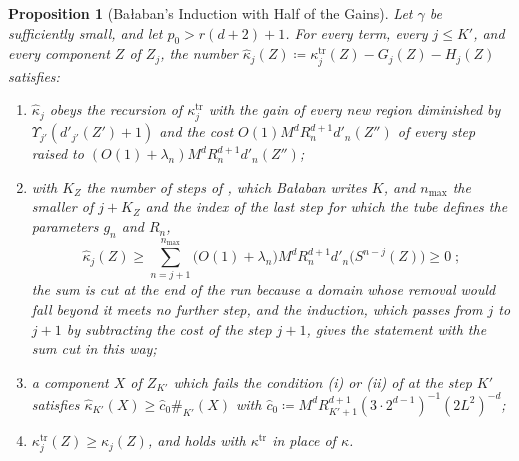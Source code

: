 \documentclass[11pt]{preprint}
\numberwithin{equation}{section}
\newtheorem{proposition}{Proposition}
\theoremstyle{definition}
\theoremstyle{remark}
\theoremstyle{plain}
\begin{document}
\begin{proposition}[Ba{\l}aban's Induction with Half of the Gains]\label{prop:half-gains}
Let $\gamma$ be sufficiently small, and let $p_0 > r(d + 2) + 1$. For every term, every $j \leq K'$, and every component $Z$ of $Z_j$, the number $\hat\kappa_j(Z) \coloneqq \kappa^{\mathrm{tr}}_j(Z) - G_j(Z) - H_j(Z)$ satisfies:
\begin{enumerate}[label=(\roman*)]
\item $\hat\kappa_j$ obeys the recursion of $\kappa^{\mathrm{tr}}_j$ with the gain of every new region diminished by $\Upsilon_{j'}(d'_{j'}(Z') + 1)$ and the cost $O(1)M^dR_n^{d+1}d'_n(Z'')$ of every step raised to $(O(1) + \lambda_n)M^dR_n^{d+1}d'_n(Z'')$;
\item with $K_Z$ the number of steps of \cite[(1.80)]{BalabanLFR2}, which Ba{\l}aban writes $K$, and $n_{\max}$ the smaller of $j + K_Z$ and the index of the last step for which the tube defines the parameters $g_n$ and $R_n$,
\begin{equation}\label{eq:half-gain-induction}
    \hat\kappa_j(Z) \geq \sum_{n=j+1}^{n_{\max}}\bigl(O(1) + \lambda_n\bigr)M^dR_n^{d+1}d'_n\bigl(S^{n-j}(Z)\bigr) \geq 0\;;
\end{equation}
the sum is cut at the end of the run because a domain whose removal would fall beyond it meets no further step, and the induction, which passes from $j$ to $j + 1$ by subtracting the cost of the step $j + 1$, gives the statement with the sum cut in this way;
\item a component $X$ of $Z_{K'}$ which fails the condition (i) or (ii) of \cite[p.~177]{BalabanLFR1} at the step $K'$ satisfies $\hat\kappa_{K'}(X) \geq \hat c_0\#_{K'}(X)$ with $\hat c_0 \coloneqq M^dR_{K'+1}^{d+1}(3 \cdot 2^{d-1})^{-1}(2L^2)^{-d}$;
\item $\kappa^{\mathrm{tr}}_j(Z) \geq \kappa_j(Z)$, and \cite[(1.79)]{BalabanLFR2} holds with $\kappa^{\mathrm{tr}}$ in place of $\kappa$.
\end{enumerate}
\end{proposition}
\end{document}
